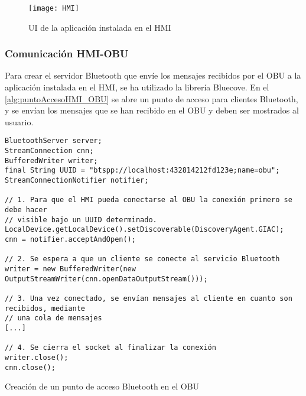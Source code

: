 	\begin{figure}[H]
			\begin{center}
				\texttt{[image: HMI]}
				\caption{UI de la aplicación instalada en el HMI}
				\label{figure:HMI}
			\end{center}
	\end{figure}
	
	\subsubsection{Comunicación HMI-OBU}
	Para crear el servidor Bluetooth que envíe los mensajes recibidos por el OBU a la aplicación instalada en el HMI, se ha utilizado la librería Bluecove. En el \ref{alg:puntoAccesoHMI_OBU} se abre un punto de acceso para clientes Bluetooth, y se envían los mensajes que se han recibido en el OBU y deben ser mostrados al usuario.

	\begin{listing}
		\begin{minipage}{.4\textwidth}
			\begin{verbatim}
BluetoothServer server;
StreamConnection cnn;
BufferedWriter writer;
final String UUID = "btspp://localhost:432814212fd123e;name=obu";
StreamConnectionNotifier notifier;
					
// 1. Para que el HMI pueda conectarse al OBU la conexión primero se debe hacer
// visible bajo un UUID determinado.
LocalDevice.getLocalDevice().setDiscoverable(DiscoveryAgent.GIAC);
cnn = notifier.acceptAndOpen();					
					
// 2. Se espera a que un cliente se conecte al servicio Bluetooth
writer = new BufferedWriter(new OutputStreamWriter(cnn.openDataOutputStream()));
					
// 3. Una vez conectado, se envían mensajes al cliente en cuanto son recibidos, mediante
// una cola de mensajes
[...]
					
// 4. Se cierra el socket al finalizar la conexión
writer.close();
cnn.close();
			\end{verbatim}
		\end{minipage}
		\caption{Creación de un punto de acceso Bluetooth en el OBU}\label{alg:puntoAccesoHMI_OBU}
	\end{listing}


